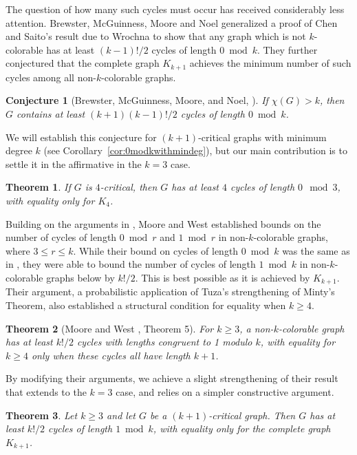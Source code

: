 \documentclass[12pt]{article}
\newtheorem{theorem}{Theorem}
\numberwithin{theorem}{section}
\newtheorem{conjecture}{Conjecture}
\begin{document}
The question of how many such cycles must occur has received considerably less attention. Brewster, McGuinness, Moore and Noel \cite{BMMN} generalized a proof of Chen and Saito's result due to Wrochna to show that any graph which is not $k$-colorable has at least $(k-1)!/2$ cycles of length $0\bmod k$. They further conjectured that the complete graph $K_{k+1}$ achieves the minimum number of such cycles among all non-$k$-colorable graphs.

\begin{conjecture}[Brewster, McGuinness, Moore, and Noel, \cite{BMMN}]
\label{conj:BMMN}
If $\chi(G)>k$, then $G$ contains at least $(k+1)(k-1)!/2$ cycles of length $0 \bmod k$.
\end{conjecture}

We will establish this conjecture for $(k+1)$-critical graphs with minimum degree $k$ (see Corollary~\ref{cor:0modkwithmindeg}), but our main contribution is to settle it in the affirmative in the $k=3$ case.

\begin{theorem}\label{thm:mainresult}
If $G$ is $4$-critical, then $G$ has at least $4$ cycles of length $0 \mod 3$, with equality only for $K_4$.
\end{theorem}

Building on the arguments in \cite{BMMN}, Moore and West \cite{MW} established bounds on the number of cycles of length $0 \bmod r$ and $1\bmod r$ in non-$k$-colorable graphs, where $3 \le r \le k$. While their bound on cycles of length $0\bmod k$ was the same as in \cite{BMMN}, they were able to bound the number of cycles of length $1\bmod k$ in non-$k$-colorable graphs below by $k!/2$. This is best possible as it is achieved by $K_{k+1}$. Their argument, a probabilistic application of Tuza's strengthening of Minty's Theorem, also established a structural condition for equality when $k\ge 4$.

\begin{theorem}[Moore and West \cite{MW}, Theorem 5]\label{thm:moorewestthm5}
For $k \ge 3$, a non-$k$-colorable graph has at least $k!/2$ cycles with lengths
congruent to 1 modulo $k$, with equality for $k \ge 4$ only when these cycles all have length
$k + 1$.
\end{theorem}

By modifying their arguments, we achieve a slight strengthening of their result that extends to the $k=3$ case, and relies on a simpler constructive argument.

\begin{theorem}\label{thm:1modkbound}
Let $k \ge 3$ and let $G$ be a $(k+1)$-critical graph. Then $G$ has at least $k!/2$ cycles of length $1 \bmod k$, with equality only for the complete graph $K_{k+1}$.\\
\end{theorem}
\end{document}
